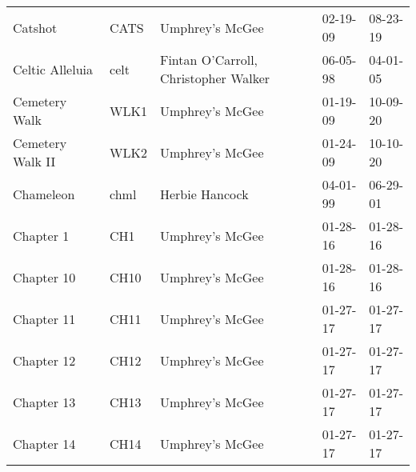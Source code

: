 \begin{longtable}{p{}p{}p{}p{}p{}}
                                                                 Catshot &          CATS &                                          Umphrey's McGee &              02-19-09 &             08-23-19 \\
                                                         Celtic Alleluia &          celt &                     Fintan O'Carroll, Christopher Walker &              06-05-98 &             04-01-05 \\
                                                           Cemetery Walk &          WLK1 &                                          Umphrey's McGee &              01-19-09 &             10-09-20 \\
                                                        Cemetery Walk II &          WLK2 &                                          Umphrey's McGee &              01-24-09 &             10-10-20 \\
                                                               Chameleon &          chml &                                           Herbie Hancock &              04-01-99 &             06-29-01 \\
                                                               Chapter 1 &           CH1 &                                          Umphrey's McGee &              01-28-16 &             01-28-16 \\
                                                              Chapter 10 &          CH10 &                                          Umphrey's McGee &              01-28-16 &             01-28-16 \\
                                                              Chapter 11 &          CH11 &                                          Umphrey's McGee &              01-27-17 &             01-27-17 \\
                                                              Chapter 12 &          CH12 &                                          Umphrey's McGee &              01-27-17 &             01-27-17 \\
                                                              Chapter 13 &          CH13 &                                          Umphrey's McGee &              01-27-17 &             01-27-17 \\
                                                              Chapter 14 &          CH14 &                                          Umphrey's McGee &              01-27-17 &             01-27-17 \\

\end{longtable}
